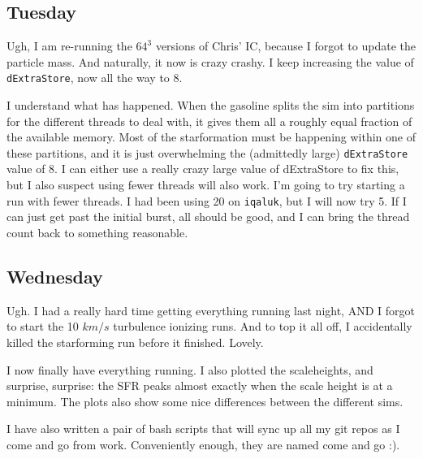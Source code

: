 \documentclass[11pt,letterpaper]{article}
\begin{document}
\subsection*{Tuesday}
Ugh, I am re-running the $64^3$ versions of Chris' IC, because I forgot to 
update the particle mass. And naturally, it now is crazy crashy.  I keep 
increasing the value of \verb!dExtraStore!, now all the way to 8.

I understand what has happened.  When the gasoline splits the sim into 
partitions for the different threads to deal with, it gives them all a roughly
equal fraction of the available memory.  Most of the starformation must be 
happening within one of these partitions, and it is just overwhelming the
(admittedly large) \verb!dExtraStore! value of 8.  I can either use a really
crazy large value of dExtraStore to fix this, but I also suspect using  fewer
threads will also work.  I'm going to try starting a run with fewer threads.
I had been using 20 on \verb!iqaluk!, but I will now try 5.  If I can 
just get past the initial burst, all should be good, and I can bring the 
thread count back to something reasonable.

\subsection*{Wednesday}
Ugh.  I had a really hard time getting everything running last night, AND
I forgot to start the 10 $km/s$ turbulence ionizing runs.  And to top it all
off, I accidentally killed the starforming run before it finished.  Lovely.

I now finally have everything running.  I also plotted the scaleheights, and 
surprise, surprise: the SFR peaks almost exactly when the scale height is at
a minimum.  The plots also show some nice differences between the different
sims.

I have also written a pair of bash scripts that will sync up all my git repos
as I come and go from work.  Conveniently enough, they are named come and go :).
\end{document}
